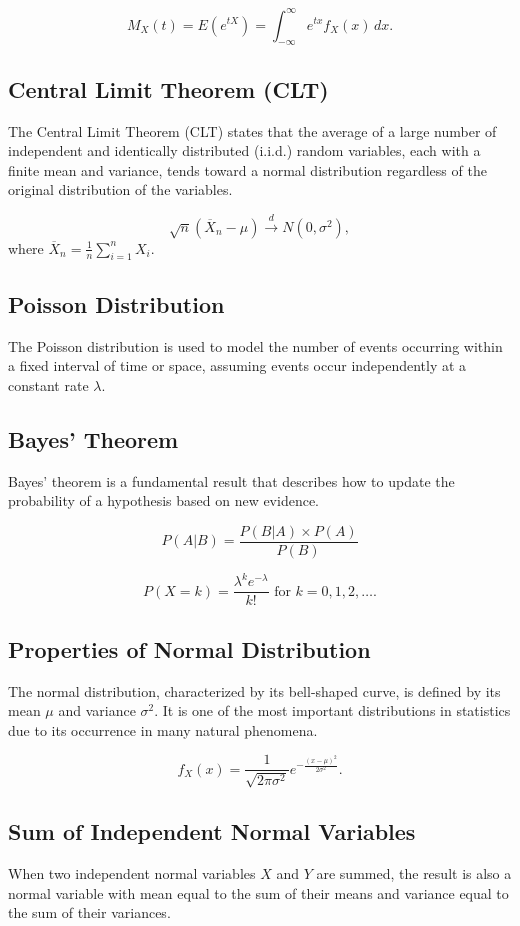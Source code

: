 \documentclass[12pt]{article}
\begin{document}
\[
M_X(t) = E(e^{tX}) = \int_{-\infty}^{\infty} e^{tx} f_X(x) \, dx.
\]

\subsection*{Central Limit Theorem (CLT)}
The Central Limit Theorem (CLT) states that the average of a large number of independent and identically distributed (i.i.d.) random variables, each with a finite mean and variance, tends toward a normal distribution regardless of the original distribution of the variables.

\[
\sqrt{n}(\overline{X}_n - \mu) \xrightarrow{d} N(0, \sigma^2),
\]
where $\overline{X}_n = \frac{1}{n} \sum_{i=1}^n X_i$.

\subsection*{Poisson Distribution}
The Poisson distribution is used to model the number of events occurring within a fixed interval of time or space, assuming events occur independently at a constant rate $\lambda$.


\subsection*{Bayes' Theorem}
Bayes' theorem is a fundamental result that describes how to update the probability of a hypothesis based on new evidence.

\[
P(A | B) = \frac{P(B | A) \times P(A)}{P(B)}
\]

\[
P(X = k) = \frac{\lambda^k e^{-\lambda}}{k!} \text{ for } k = 0, 1, 2, \dots.
\]

\subsection*{Properties of Normal Distribution}
The normal distribution, characterized by its bell-shaped curve, is defined by its mean $\mu$ and variance $\sigma^2$. It is one of the most important distributions in statistics due to its occurrence in many natural phenomena.

\[
f_X(x) = \frac{1}{\sqrt{2\pi \sigma^2}} e^{-\frac{(x-\mu)^2}{2\sigma^2}}.
\]

\subsection*{Sum of Independent Normal Variables}
When two independent normal variables $X$ and $Y$ are summed, the result is also a normal variable with mean equal to the sum of their means and variance equal to the sum of their variances.
\end{document}
